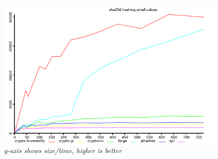 \begin{figure}[htpb]
\centering
\caption{\small \sl y-axis shows size/time, higher is better
\label{fig:small-hash-sha256}}
\includegraphics[scale=0.6]{graphs/small-hash-sha256.png}
\end{figure}

